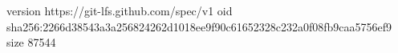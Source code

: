 version https://git-lfs.github.com/spec/v1
oid sha256:2266d38543a3a256824262d1018ee9f90c61652328c232a0f08fb9caa5756ef9
size 87544
